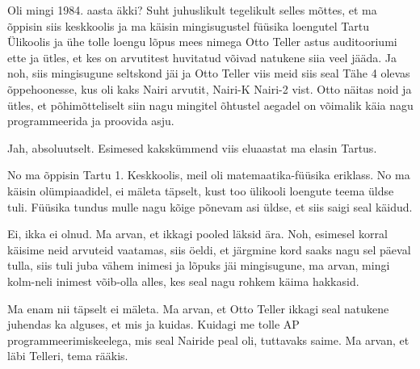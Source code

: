 

Oli mingi 1984. aasta äkki? Suht juhuslikult tegelikult selles mõttes, et ma 
õppisin siis keskkoolis ja ma käisin mingisugustel füüsika loengutel Tartu 
Ülikoolis ja ühe tolle loengu lõpus mees nimega Otto 
Teller astus auditooriumi ette ja ütles, et kes on 
arvutitest huvitatud võivad natukene siia veel jääda. Ja noh, siis mingisugune 
seltskond jäi ja Otto Teller viis meid siis seal Tähe 4 olevas 
õppehoonesse, kus oli kaks Nairi arvutit, 
Nairi-K Nairi-2 vist. 
Otto näitas noid ja ütles, et põhimõtteliselt siin nagu mingitel õhtustel 
aegadel on võimalik käia nagu programmeerida ja proovida asju.


Jah, absoluutselt. Esimesed kakskümmend viis eluaastat ma elasin Tartus. 


No ma õppisin Tartu 1. Keskkoolis, meil oli 
matemaatika-füüsika eriklass. No ma käisin olümpiaadidel, ei mäleta täpselt, 
kust too ülikooli loengute teema üldse tuli. Füüsika tundus mulle nagu kõige 
põnevam asi üldse, et siis  saigi seal käidud.


Ei, ikka ei olnud. Ma arvan, et ikkagi pooled läksid ära. Noh, esimesel korral 
käisime neid arvuteid vaatamas, siis öeldi, et järgmine kord saaks nagu sel 
päeval tulla, siis tuli juba vähem inimesi ja lõpuks jäi mingisugune, ma arvan, 
mingi kolm-neli inimest võib-olla alles, kes seal nagu rohkem käima hakkasid.


Ma enam nii täpselt ei mäleta. Ma arvan, et Otto Teller ikkagi seal natukene juhendas ka alguses, et mis ja kuidas. Kuidagi me 
tolle AP 
programmeerimiskeelega, mis seal Nairide  peal oli, tuttavaks saime. Ma arvan, et läbi 
Telleri, tema rääkis.

